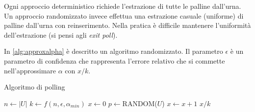 Ogni approccio deterministico richiede l'estrazione di tutte le palline dall'urna. Un approccio randomizzato invece effettua una estrazione casuale (uniforme) di palline dall'urna con reinserimento. Nella pratica è difficile mantenere l'uniformità dell'estrazione (si pensi agli \textit{exit poll}).

In \ref{alg:approxalpha} è descritto un algoritmo randomizzato. Il parametro $\epsilon$ è un parametro di confidenza che rappresenta l'errore relativo che si commette nell'approssimare $\alpha$ con $x/k$.

\begin{algorithm}
\caption{Algoritmo di polling}
\label{alg:approxalpha}
\begin{algorithmic}
	\State $n\gets |U|$
	\State $k\gets f(n,\epsilon,\alpha_{min})$
	\State $x\gets 0$
		\State $p \gets$RANDOM($U$)
			\State $x \gets x+1$
		\EndIf
	\EndFor
	\State \Return $x/k$
\EndFunction
\end{algorithmic}
\end{algorithm}

